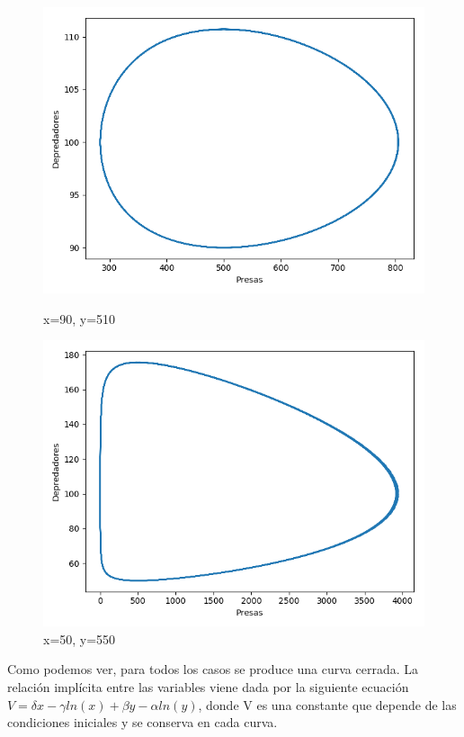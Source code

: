 \documentclass[11pt,a4paper]{article}
\begin{document}
\begin{figure}[H]
	\centering
	\begin{minipage}{0.5\textwidth}
	  \centering
	  \includegraphics[scale=0.4]{img/3-90-510.png}
	  \caption{x=90,  y=510}
	\end{minipage}%
	\begin{minipage}{0.5\textwidth}
	  \centering
	  \includegraphics[scale=0.4]{img/3-50-550.png}
	  \caption{x=50,  y=550}
	\end{minipage}
\end{figure}

Como podemos ver, para todos los casos se produce una curva cerrada. La relación implícita entre las variables viene dada por la siguiente
ecuación $V=\delta x-\gamma ln(x)+\beta y-\alpha ln(y)$, donde V es una constante que depende de las condiciones iniciales y se conserva en
cada curva.
\end{document}

